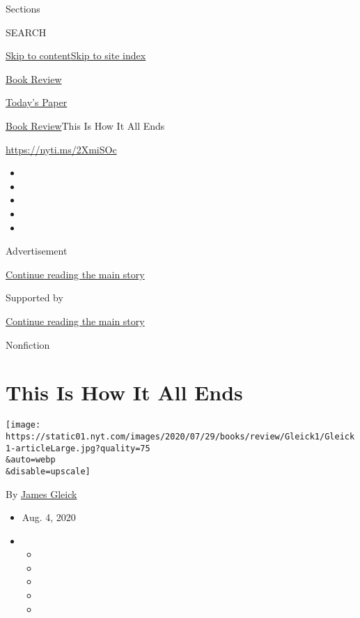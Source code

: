 Sections

SEARCH

\protect\hyperlink{site-content}{Skip to
content}\protect\hyperlink{site-index}{Skip to site index}

\href{https://www.nytimes.com/section/books/review}{Book Review}

\href{https://myaccount.nytimes.com/auth/login?response_type=cookie\&client_id=vi}{}

\href{https://www.nytimes.com/section/todayspaper}{Today's Paper}

\href{/section/books/review}{Book Review}\textbar{}This Is How It All
Ends

\url{https://nyti.ms/2XmiSOc}

\begin{itemize}
\item
\item
\item
\item
\item
\end{itemize}

Advertisement

\protect\hyperlink{after-top}{Continue reading the main story}

Supported by

\protect\hyperlink{after-sponsor}{Continue reading the main story}

Nonfiction

\hypertarget{this-is-how-it-all-ends}{%
\section{This Is How It All Ends}\label{this-is-how-it-all-ends}}

\texttt{[image: https://static01.nyt.com/images/2020/07/29/books/review/Gleick1/Gleick1-articleLarge.jpg?quality=75\\\&auto=webp\\\&disable=upscale]}

By \href{https://www.nytimes.com/by/james-gleick}{James Gleick}

\begin{itemize}
\item
  Aug. 4, 2020
\item
  \begin{itemize}
  \item
  \item
  \item
  \item
  \item
  \end{itemize}
\end{itemize}

